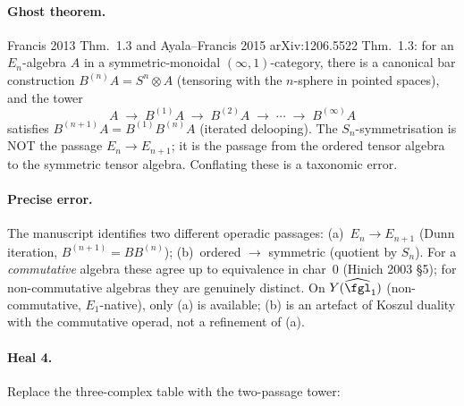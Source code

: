 \paragraph{Ghost theorem.}  Francis 2013 Thm.~1.3 and
Ayala--Francis 2015 arXiv:1206.5522 Thm.~1.3: for an $E_n$-algebra
$A$ in a symmetric-monoidal $(\infty,1)$-category, there is a
canonical bar construction $B^{(n)}A = S^n\otimes A$ (tensoring with
the $n$-sphere in pointed spaces), and the tower
\[
A \;\to\; B^{(1)}A \;\to\; B^{(2)}A \;\to\; \cdots \;\to\; B^{(\infty)}A
\]
satisfies $B^{(n+1)}A = B^{(1)} B^{(n)}A$ (iterated delooping).  The
$S_n$-symmetrisation is NOT the passage $E_n\to E_{n+1}$; it is the
passage from the ordered tensor algebra to the symmetric tensor
algebra.  Conflating these is a taxonomic error.

\paragraph{Precise error.}  The manuscript identifies two different
operadic passages:
(a)~$E_n \to E_{n+1}$ (Dunn iteration, $B^{(n+1)} = B B^{(n)}$);
(b)~ordered $\to$ symmetric (quotient by $S_n$).
For a \emph{commutative} algebra these agree up to equivalence in
char~$0$ (Hinich 2003 \S5); for non-commutative algebras they are
genuinely distinct.  On $Y(\widehat{\fgl}_1)$ (non-commutative,
$E_1$-native), only (a) is available; (b) is an artefact of Koszul
duality with the commutative operad, not a refinement of (a).

\paragraph{Heal 4.}  Replace the three-complex table with the
two-passage tower:

